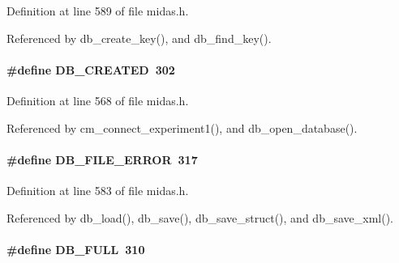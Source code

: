 \begin{DoxyItemize}
\item 
\end{DoxyItemize}

Definition at line 589 of file midas.h.

Referenced by db\_\-create\_\-key(), and db\_\-find\_\-key().
\paragraph[{DB\_\-CREATED}]{\setlength{\rightskip}{0pt plus 5cm}\#define DB\_\-CREATED~302}\hfill\label{group__err23_gabd18ddb49dba3429ea159610875283ec}

\begin{DoxyItemize}
\item 
\end{DoxyItemize}

Definition at line 568 of file midas.h.

Referenced by cm\_\-connect\_\-experiment1(), and db\_\-open\_\-database().
\paragraph[{DB\_\-FILE\_\-ERROR}]{\setlength{\rightskip}{0pt plus 5cm}\#define DB\_\-FILE\_\-ERROR~317}\hfill\label{group__err23_ga39b1479e417376866f2658812ae4ba6b}

\begin{DoxyItemize}
\item 
\end{DoxyItemize}

Definition at line 583 of file midas.h.

Referenced by db\_\-load(), db\_\-save(), db\_\-save\_\-struct(), and db\_\-save\_\-xml().
\paragraph[{DB\_\-FULL}]{\setlength{\rightskip}{0pt plus 5cm}\#define DB\_\-FULL~310}\hfill\label{group__err23_ga25a395a210f89c1a6cfa6efd724657c0}

\begin{DoxyItemize}
\item 
\end{DoxyItemize}


